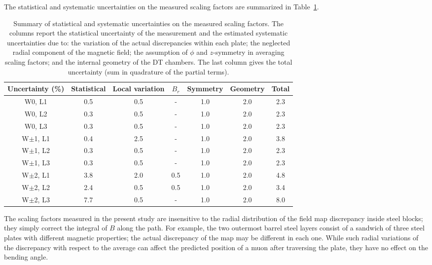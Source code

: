 The statistical and systematic uncertainties on the measured scaling
factors are summarized in Table~\ref{tab:systematics}.

\begin{table}[htbH]
\begin{center}
\caption{Summary of statistical and systematic uncertainties on the
  measured scaling factors.
  The columns report the statistical uncertainty of the measurement and the
  estimated systematic uncertainties due to: the variation of the
  actual discrepancies within each plate; the neglected radial
  component of the magnetic field; the assumption of $\phi$ and $z$-symmetry
  in averaging scaling factors; and the internal geometry of the DT
  chambers. The last column gives the total uncertainty (sum in
  quadrature of the partial terms).
\label{tab:systematics}}
\vspace{3mm}
\begin{tabular}{c|cccccc}
\hline
Uncertainty (\%) & Statistical & Local variation & $B_r$ & Symmetry & Geometry & Total\\
\hline
W0, L1  & 0.5 & 0.5 & - & 1.0 & 2.0 & 2.3  \\
W0, L2  & 0.3 & 0.5 & - & 1.0 & 2.0 & 2.3  \\
W0, L3  & 0.3 & 0.5 & - & 1.0 & 2.0 & 2.3  \\
W$\pm$1, L1  & 0.4 & 2.5 & - & 1.0 & 2.0 & 3.8  \\
W$\pm$1, L2  & 0.3 & 0.5 & - & 1.0 & 2.0 & 2.3  \\
W$\pm$1, L3  & 0.3 & 0.5 & - & 1.0 & 2.0 & 2.3  \\
W$\pm$2, L1  & 3.8 & 2.0 & 0.5 & 1.0 & 2.0 & 4.8 \\
W$\pm$2, L2  & 2.4 & 0.5 & 0.5 & 1.0 & 2.0 & 3.4 \\
W$\pm$2, L3  & 7.7 & 0.5 & - & 1.0 & 2.0 & 8.0  \\
\hline
\end{tabular}
\end{center}
\end{table}

The scaling factors measured in the present study
are insensitive to the radial distribution of the field map discrepancy
inside steel blocks; they simply correct the integral of $B$ along the path.
For example, the two outermost barrel steel layers consist of a
sandwich of three steel plates with different magnetic properties; the
actual discrepancy of the map may be different in each one.
While such radial variations of the discrepancy with respect to the average
can affect the predicted position of a muon after traversing the plate,
they have no effect on the bending angle.

